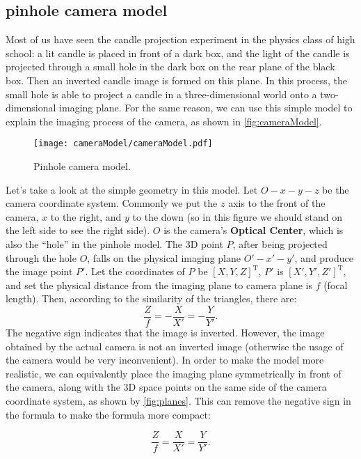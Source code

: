 \subsection{pinhole camera model}
Most of us have seen the candle projection experiment in the physics class of high school: a lit candle is placed in front of a dark box, and the light of the candle is projected through a small hole in the dark box on the rear plane of the black box. Then an inverted candle image is formed on this plane. In this process, the small hole is able to project a candle in a three-dimensional world onto a two-dimensional imaging plane. For the same reason, we can use this simple model to explain the imaging process of the camera, as shown in \autoref{fig:cameraModel}.

\begin{figure}[!ht]
	\centering
	\texttt{[image: cameraModel/cameraModel.pdf]}
	\caption{Pinhole camera model. }
	\label{fig:cameraModel}
\end{figure}

Let's take a look at the simple geometry in this model. Let $O-x-y-z$ be the camera coordinate system. Commonly we put the $z$ axis to the front of the camera, $x$ to the right, and $y$ to the down (so in this figure we should stand on the left side to see the right side). $O$ is the camera's \textbf{Optical Center}, which is also the ``hole'' in the pinhole model. The 3D point $P$, after being projected through the hole $O$, falls on the physical imaging plane $O'-x'-y'$, and produce the image point $P'$. Let the coordinates of $P$ be $[X,Y,Z]^\mathrm{T}$, $P'$ is $[X',Y',Z']^\mathrm{T}$, and set the physical distance from the imaging plane to camera plane is $f$ (focal length). Then, according to the similarity of the triangles, there are:
\begin{equation}
\frac{Z}{f} = -\frac{X}{{X'}} =-\frac{Y}{{Y'}}.
\end{equation}
The negative sign indicates that the image is inverted. However, the image obtained by the actual camera is not an inverted image (otherwise the usage of the camera would be very inconvenient). In order to make the model more realistic, we can equivalently place the imaging plane symmetrically in front of the camera, along with the 3D space points on the same side of the camera coordinate system, as shown by \autoref{fig:planes}. This can remove the negative sign in the formula to make the formula more compact:

\begin{equation}
\frac{Z}{f} = \frac{X}{{X'}} =\frac{Y}{{Y'}}.
\end{equation}

